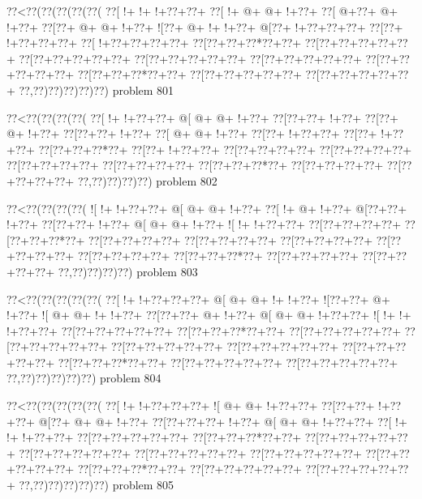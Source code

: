 \vbox{\vbox{\goo
\0??<\0??(\0??(\0??(\0??(\0??(
\0??[\- !+\- !+\- !+\0??+\0??+
\0??[\- !+\- @+\- @+\- !+\0??+
\0??[\- @+\0??+\- @+\- !+\0??+
\0??[\0??+\- @+\- @+\- !+\0??+
\- ![\0??+\- @+\- !+\- !+\0??+
\- @[\0??+\- !+\0??+\0??+\0??+
\0??[\0??+\- !+\0??+\0??+\0??+
\0??[\- !+\0??+\0??+\0??+\0??+
\0??[\0??+\0??+\0??*\0??+\0??+
\0??[\0??+\0??+\0??+\0??+\0??+
\0??[\0??+\0??+\0??+\0??+\0??+
\0??[\0??+\0??+\0??+\0??+\0??+
\0??[\0??+\0??+\0??+\0??+\0??+
\0??[\0??+\0??+\0??+\0??+\0??+
\0??[\0??+\0??+\0??*\0??+\0??+
\0??[\0??+\0??+\0??+\0??+\0??+
\0??[\0??+\0??+\0??+\0??+\0??+
\0??,\0??)\0??)\0??)\0??)\0??)
}
\hfil problem 801\hfil\break
}

\vbox{\vbox{\goo
\0??<\0??(\0??(\0??(\0??(
\0??[\- !+\- !+\0??+\0??+
\- @[\- @+\- @+\- !+\0??+
\0??[\0??+\0??+\- !+\0??+
\0??[\0??+\- @+\- !+\0??+
\0??[\0??+\0??+\- !+\0??+
\0??[\- @+\- @+\- !+\0??+
\0??[\0??+\- !+\0??+\0??+
\0??[\0??+\- !+\0??+\0??+
\0??[\0??+\0??+\0??*\0??+
\0??[\0??+\- !+\0??+\0??+
\0??[\0??+\0??+\0??+\0??+
\0??[\0??+\0??+\0??+\0??+
\0??[\0??+\0??+\0??+\0??+
\0??[\0??+\0??+\0??+\0??+
\0??[\0??+\0??+\0??*\0??+
\0??[\0??+\0??+\0??+\0??+
\0??[\0??+\0??+\0??+\0??+
\0??,\0??)\0??)\0??)\0??)
}
\hfil problem 802\hfil\break
}

\vbox{\vbox{\goo
\0??<\0??(\0??(\0??(\0??(
\- ![\- !+\- !+\0??+\0??+
\- @[\- @+\- @+\- !+\0??+
\0??[\- !+\- @+\- !+\0??+
\- @[\0??+\0??+\- !+\0??+
\0??[\0??+\0??+\- !+\0??+
\- @[\- @+\- @+\- !+\0??+
\- ![\- !+\- !+\0??+\0??+
\0??[\0??+\0??+\0??+\0??+
\0??[\0??+\0??+\0??*\0??+
\0??[\0??+\0??+\0??+\0??+
\0??[\0??+\0??+\0??+\0??+
\0??[\0??+\0??+\0??+\0??+
\0??[\0??+\0??+\0??+\0??+
\0??[\0??+\0??+\0??+\0??+
\0??[\0??+\0??+\0??*\0??+
\0??[\0??+\0??+\0??+\0??+
\0??[\0??+\0??+\0??+\0??+
\0??,\0??)\0??)\0??)\0??)
}
\hfil problem 803\hfil\break
}

\vbox{\vbox{\goo
\0??<\0??(\0??(\0??(\0??(\0??(
\0??[\- !+\- !+\0??+\0??+\0??+
\- @[\- @+\- @+\- !+\- !+\0??+
\- ![\0??+\0??+\- @+\- !+\0??+
\- ![\- @+\- @+\- !+\- !+\0??+
\0??[\0??+\0??+\- @+\- !+\0??+
\- @[\- @+\- @+\- !+\0??+\0??+
\- ![\- !+\- !+\- !+\0??+\0??+
\0??[\0??+\0??+\0??+\0??+\0??+
\0??[\0??+\0??+\0??*\0??+\0??+
\0??[\0??+\0??+\0??+\0??+\0??+
\0??[\0??+\0??+\0??+\0??+\0??+
\0??[\0??+\0??+\0??+\0??+\0??+
\0??[\0??+\0??+\0??+\0??+\0??+
\0??[\0??+\0??+\0??+\0??+\0??+
\0??[\0??+\0??+\0??*\0??+\0??+
\0??[\0??+\0??+\0??+\0??+\0??+
\0??[\0??+\0??+\0??+\0??+\0??+
\0??,\0??)\0??)\0??)\0??)\0??)
}
\hfil problem 804\hfil\break
}

\vbox{\vbox{\goo
\0??<\0??(\0??(\0??(\0??(\0??(
\0??[\- !+\- !+\0??+\0??+\0??+
\- ![\- @+\- @+\- !+\0??+\0??+
\0??[\0??+\0??+\- !+\0??+\0??+
\- @[\0??+\- @+\- @+\- !+\0??+
\0??[\0??+\0??+\0??+\- !+\0??+
\- @[\- @+\- @+\- !+\0??+\0??+
\0??[\- !+\- !+\- !+\0??+\0??+
\0??[\0??+\0??+\0??+\0??+\0??+
\0??[\0??+\0??+\0??*\0??+\0??+
\0??[\0??+\0??+\0??+\0??+\0??+
\0??[\0??+\0??+\0??+\0??+\0??+
\0??[\0??+\0??+\0??+\0??+\0??+
\0??[\0??+\0??+\0??+\0??+\0??+
\0??[\0??+\0??+\0??+\0??+\0??+
\0??[\0??+\0??+\0??*\0??+\0??+
\0??[\0??+\0??+\0??+\0??+\0??+
\0??[\0??+\0??+\0??+\0??+\0??+
\0??,\0??)\0??)\0??)\0??)\0??)
}
\hfil problem 805\hfil\break
}

